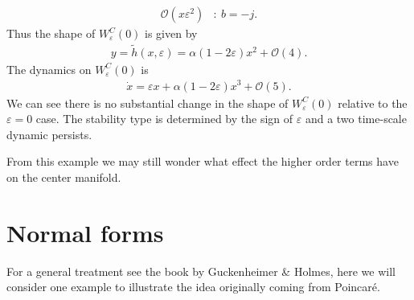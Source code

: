 \begin{ex}
\begin{align}
		\mathcal{O}(x\varepsilon^2)&:\ b=-j.
	\end{align}
	Thus the shape of $W^{C}_{\varepsilon}(0)$ is given by 
	\begin{align}
		y = \tilde{h}(x,\varepsilon) = \alpha(1-2\varepsilon)x^2+ \mathcal{O}(4).
	\end{align}
	The dynamics on $W^{C}_{\varepsilon}(0)$ is
	\begin{align}
		\dot{x} = \varepsilon x + \alpha(1-2\varepsilon)x^3 + \mathcal{O}(5).
	\end{align}
	We can see there is no substantial change in the shape of $W^{C}_{\varepsilon}(0)$ relative to the $\varepsilon=0$ case. The stability type is determined by the sign of $\varepsilon$ and a two time-scale dynamic persists.	
\end{ex}
From this example we may still wonder what effect the higher order terms have on the center manifold.

\section{Normal forms}
For a general treatment see the book by Guckenheimer \& Holmes, here we will consider one example to illustrate the idea originally coming from Poincaré.

